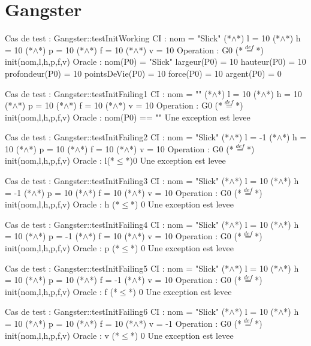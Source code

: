 \documentclass[a4paper, 11pt, notitlepage]{report}
\begin{document}
\section*{Gangster}
\begin{Test}

Cas de test  : Gangster::testInitWorking
CI : nom = "Slick" (*$\land$*) l = 10 (*$\land$*) h = 10 (*$\land$*) p = 10 (*$\land$*) f = 10 (*$\land$*) v = 10
Operation : G0 (*$\stackrel{def}{=}$*) init(nom,l,h,p,f,v)
Oracle :
	nom(P0) = "Slick"
	largeur(P0) = 10
	hauteur(P0) = 10
	profondeur(P0) = 10
	pointsDeVie(P0) = 10
	force(P0) = 10
	argent(P0) = 0

Cas de test  : Gangster::testInitFailing1
CI : nom = "" (*$\land$*) l = 10 (*$\land$*) h = 10 (*$\land$*) p = 10 (*$\land$*) f = 10 (*$\land$*) v = 10
Operation : G0 (*$\stackrel{def}{=}$*) init(nom,l,h,p,f,v)
Oracle :
	nom(P0) == ""
	Une exception est levee
	
Cas de test  : Gangster::testInitFailing2
CI : nom = "Slick" (*$\land$*) l = -1 (*$\land$*) h = 10 (*$\land$*) p = 10 (*$\land$*) f = 10 (*$\land$*) v = 10
Operation : G0 (*$\stackrel{def}{=}$*) init(nom,l,h,p,f,v)
Oracle :
	l(*$\le$*)0
	Une exception est levee

Cas de test  : Gangster::testInitFailing3
CI : nom = "Slick" (*$\land$*) l = 10 (*$\land$*) h = -1 (*$\land$*) p = 10 (*$\land$*) f = 10 (*$\land$*) v = 10
Operation : G0 (*$\stackrel{def}{=}$*) init(nom,l,h,p,f,v)
Oracle :
	h (*$\le$*) 0
	Une exception est levee
	
Cas de test  : Gangster::testInitFailing4
CI : nom = "Slick" (*$\land$*) l = 10 (*$\land$*) h = 10 (*$\land$*) p = -1 (*$\land$*) f = 10 (*$\land$*) v = 10
Operation : G0 (*$\stackrel{def}{=}$*) init(nom,l,h,p,f,v)
Oracle :
	p (*$\le$*) 0
	Une exception est levee

Cas de test  : Gangster::testInitFailing5
CI : nom = "Slick" (*$\land$*) l = 10 (*$\land$*) h = 10 (*$\land$*) p = 10 (*$\land$*) f = -1 (*$\land$*) v = 10
Operation : G0 (*$\stackrel{def}{=}$*) init(nom,l,h,p,f,v)
Oracle :
	f (*$\le$*) 0
	Une exception est levee

Cas de test  : Gangster::testInitFailing6
CI : nom =  "Slick" (*$\land$*) l = 10 (*$\land$*) h = 10 (*$\land$*) p = 10 (*$\land$*) f = 10 (*$\land$*) v = -1
Operation : G0 (*$\stackrel{def}{=}$*) init(nom,l,h,p,f,v)
Oracle :
	v (*$\le$*) 0
	Une exception est levee


     
\end{Test}
\end{document}
